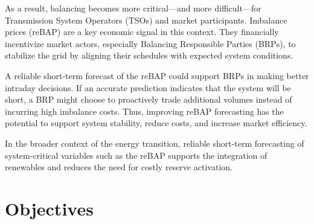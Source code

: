 \documentclass[class=scrbook, crop=false]{standalone}
\begin{document}
As a result, balancing becomes more critical—and more difficult—for Transmission System Operators (TSOs) and market participants. Imbalance prices (reBAP) are a key economic signal in this context. They financially incentivize market actors, especially Balancing Responsible Parties (BRPs), to stabilize the grid by aligning their schedules with expected system conditions.

A reliable short-term forecast of the reBAP could support BRPs in making better intraday decisions. If an accurate prediction indicates that the system will be short, a BRP might choose to proactively trade additional volumes instead of incurring high imbalance costs. Thus, improving reBAP forecasting has the potential to support system stability, reduce costs, and increase market efficiency.

In the broader context of the energy transition, reliable short-term forecasting of system-critical variables such as the reBAP supports the integration of renewables and reduces the need for costly reserve activation.

\section{Objectives}
\label{Section::Objectives}




\end{document}
